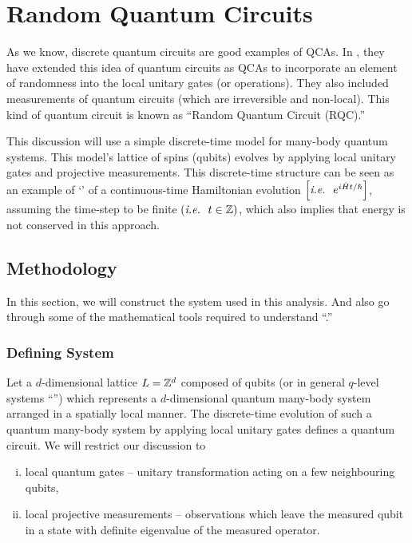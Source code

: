 \documentclass[11pt, oneside, listof=totoc]{scrbook}
\begin{document}
\chapter{Random Quantum Circuits}

As we know, discrete quantum circuits are good examples of QCAs. In \cite{Fisher2023}, they have extended this idea of quantum circuits as QCAs to incorporate an element of randomness into the local unitary gates (or operations). They also included measurements of quantum circuits (which are irreversible and non-local). This kind of quantum circuit is known as ``Random Quantum Circuit (RQC).''

This discussion will use a simple discrete-time model for many-body quantum systems. This model's lattice of spins (qubits) evolves by applying local unitary gates and projective measurements. This discrete-time structure can be seen as an example of `' of a continuous-time Hamiltonian evolution \(\qty[\textit{i.e.~} ~ e^{i \hat{H} t / \hslash}]\), assuming the time-step to be finite \(\qty(\textit{i.e.~} ~ t \in \mathbb Z)\), which also implies that energy is not conserved in this approach.

\section{Methodology}

In this section, we will construct the system used in this analysis. And also go through some of the mathematical tools required to understand ``.''

\subsection{Defining System}
Let a \(d\)-dimensional lattice \(L = \mathbb Z^{d}\) composed of qubits (or in general \(q\)-level systems ``'') which represents a \(d\)-dimensional quantum many-body system arranged in a spatially local manner. The discrete-time evolution of such a quantum many-body system by applying local unitary gates defines a quantum circuit. We will restrict our discussion to
\begin{enumerate}[(i), noitemsep]
    \item local quantum gates -- unitary transformation acting on a few neighbouring qubits,
    \item local projective measurements -- observations which leave the measured qubit in a state with definite eigenvalue of the measured operator.
\end{enumerate}
\end{document}
